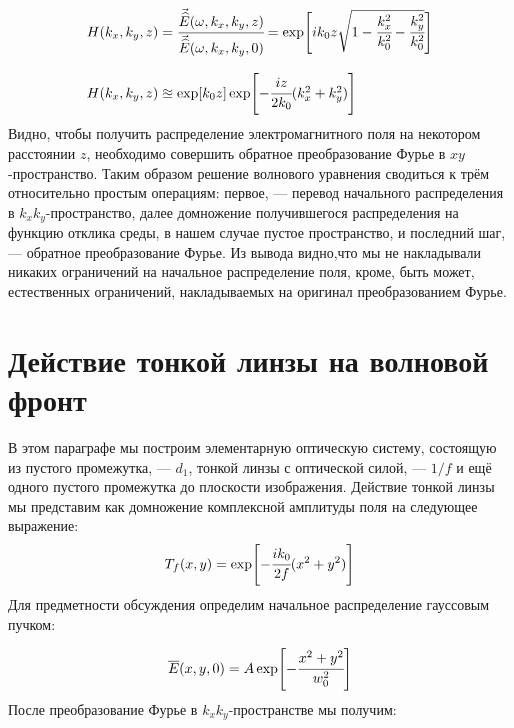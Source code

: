 \begin{equation}
	\begin{array}{lcl}
	H(k_x, k_y, z) = \cfrac{\vec{\widehat{E}}(\omega, k_x, k_y, z)}{\vec{\widehat{E}}(\omega, k_x, k_y, 0)} = \exp[ik_0z\sqrt{1 - \cfrac{k^2_x}{k^2_0} - \cfrac{k^2_y}{k^2_0}} ]
	\\
	\\
	H(k_x, k_y, z) \approxeq \exp[k_0z]\exp[-\cfrac{iz}{2k_0}(k^2_x + k^2_y)]
	\end{array}
\end{equation}
Видно, чтобы получить распределение электромагнитного поля на некотором расстоянии $z$, необходимо совершить обратное преобразование Фурье в $xy$-пространство. Таким образом решение волнового уравнения сводиться к трём относительно простым операциям: первое, --- перевод начального распределения в $k_xk_y$-пространство, далее домножение получившегося распределения на функцию отклика среды, в нашем случае пустое пространство, и последний шаг, --- обратное преобразование Фурье. Из вывода видно,что мы не накладывали никаких ограничений на начальное распределение поля, кроме, быть может, естественных ограничений, накладываемых на оригинал преобразованием Фурье.

\section{Действие тонкой линзы на волновой фронт}
В этом параграфе мы построим элементарную оптическую систему, состоящую из пустого промежутка, --- $d_1$, тонкой линзы с оптической силой, --- $1/f$ и ещё одного пустого промежутка до плоскости изображения. Действие тонкой линзы мы представим как домножение комплексной амплитуды поля на следующее выражение: 
\begin{equation}
	T_f(x, y) = \exp[-\cfrac{ik_0}{2f}(x^2 + y^2)]
\end{equation}
Для предметности обсуждения определим начальное распределение гауссовым пучком: 

\begin{equation}
	\overline{E}(x, y, 0) = A\exp[-\cfrac{x^2 + y^2}{w^2_0}]
\end{equation}
После преобразование Фурье в $k_xk_y$-пространстве мы получим:

